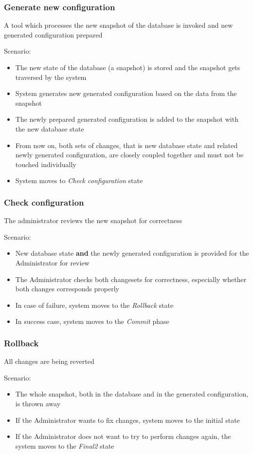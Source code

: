 \documentclass[12pt]{article}
\begin{document}
\subsubsection{Generate new configuration}
A tool which processes the new snapshot of the database is invoked and new
generated configuration prepared

Scenario:
\begin{itemize}
    \item{The new state of the database (a snapshot) is stored and the snapshot
        gets traversed by the system}
    \item{System generates new generated configuration based on the data from
        the snapshot}
    \item{The newly prepared generated configuration is added to the snapshot
        with the new database state}
    \item{From now on, both sets of changes, that is new database state and
        related newly generated configuration, are closely coupled together and
        must not be touched individually}
    \item{System moves to {\em Check configuration} state}
\end{itemize}

\subsubsection{Check configuration}
The administrator reviews the new snapshot for correctness

Scenario:
\begin{itemize}
    \item{New database state {\bf and} the newly generated configuration is
        provided for the Administrator for review}
    \item{The Administrator checks both changesets for correctness, especially
        whether both changes corresponds properly}
    \item{In case of failure, system moves to the {\em Rollback} state}
    \item{In success case, system moves to the {\em Commit} phase}
\end{itemize}

\subsubsection{Rollback}
All changes are being reverted

Scenario:
\begin{itemize}
    \item{The whole snapshot, both in the database and in the generated
        configuration, is thrown away}
    \item{If the Administrator wants to fix changes, system moves to the initial
        state}
    \item{If the Administrator does not want to try to perform changes again,
        the system moves to the {\em Final2} state}
\end{itemize}
\end{document}
